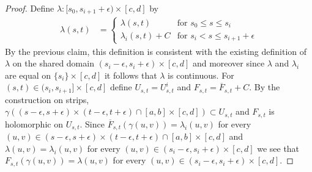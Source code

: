 \begin{proof}
  Define $\lambda : [s_0, s_{i+1}+\epsilon) \times [c,d]$ by 
  \begin{align*}
    \lambda(s,t) &= \begin{cases}
      \lambda(s,t) & \text{for $s_0 \leq s \leq s_i$} \\
      \lambda_i(s,t) + C & \text{for $s_i < s \leq s_{i+1}+\epsilon$}
      \end{cases}
  \end{align*}
  By the previous claim, this definition is consistent with the existing definition of $\lambda$ on the shared domain $(s_i-\epsilon, s_i + \epsilon) \times [c,d]$
  and moreover since $\lambda$ and $\lambda_i$ are equal on $\lbrace s_i \rbrace \times [c,d]$ it follows that $\lambda$ is continuous.
  For $(s,t) \in (s_i,s_{i+1}] \times [c,d]$ define $U_{s,t} =  U^i_{s,t}$ and $F_{s,t} = \overline{F}_{s,t}+C$.   By the construction on strips, $\gamma((s - \epsilon, s + \epsilon) \times (t - \epsilon, t+\epsilon) \cap [a,b] \times [c,d]) \subset U_{s,t}$ and $F_{s,t}$ is holomorphic on $U_{s,t}$.  Since $\overline{F}_{s,t}(\gamma(u,v)) = \lambda_i(u,v)$ for every $(u,v) \in (s - \epsilon, s+\epsilon) \times (t - \epsilon, t+ \epsilon) \cap [a,b] \times [c,d]$ and $\lambda(u,v) = \lambda_i(u,v)$ for every $(u,v) \in (s_i-\epsilon, s_i + \epsilon) \times [c,d]$ we see that $F_{s,t}(\gamma(u,v)) = \lambda(u,v)$ for every $(u,v) \in (s_i-\epsilon, s_i + \epsilon) \times [c,d]$.
\end{proof}

